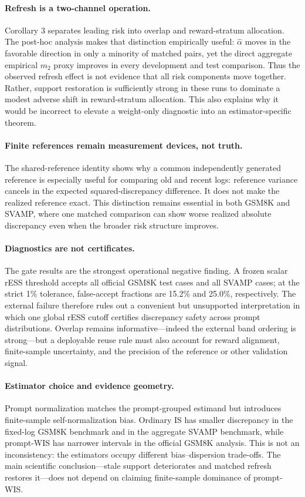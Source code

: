 \documentclass[10pt]{article}
\theoremstyle{remark}
\begin{document}
\paragraph{Refresh is a two-channel operation.}
Corollary 3 separates leading risk into overlap and reward-stratum allocation. The post-hoc analysis makes that distinction empirically useful: $\widehat\alpha$ moves in the favorable direction in only a minority of matched pairs, yet the direct aggregate empirical $m_2$ proxy improves in every development and test comparison. Thus the observed refresh effect is not evidence that all risk components move together. Rather, support restoration is sufficiently strong in these runs to dominate a modest adverse shift in reward-stratum allocation. This also explains why it would be incorrect to elevate a weight-only diagnostic into an estimator-specific theorem.

\paragraph{Finite references remain measurement devices, not truth.}
The shared-reference identity shows why a common independently generated reference is especially useful for comparing old and recent logs: reference variance cancels in the expected squared-discrepancy difference. It does not make the realized reference exact. This distinction remains essential in both GSM8K and SVAMP, where one matched comparison can show worse realized absolute discrepancy even when the broader risk structure improves.

\paragraph{Diagnostics are not certificates.}
The gate results are the strongest operational negative finding. A frozen scalar rESS threshold accepts all official GSM8K test cases and all SVAMP cases; at the strict 1\% tolerance, false-accept fractions are 15.2\% and 25.0\%, respectively. The external failure therefore rules out a convenient but unsupported interpretation in which one global rESS cutoff certifies discrepancy safety across prompt distributions. Overlap remains informative---indeed the external band ordering is strong---but a deployable reuse rule must also account for reward alignment, finite-sample uncertainty, and the precision of the reference or other validation signal.

\paragraph{Estimator choice and evidence geometry.}
Prompt normalization matches the prompt-grouped estimand but introduces finite-sample self-normalization bias. Ordinary IS has smaller discrepancy in the fixed-log GSM8K benchmark and in the aggregate SVAMP benchmark, while prompt-WIS has narrower intervals in the official GSM8K analysis. This is not an inconsistency: the estimators occupy different bias--dispersion trade-offs. The main scientific conclusion---stale support deteriorates and matched refresh restores it---does not depend on claiming finite-sample dominance of prompt-WIS.
\end{document}

